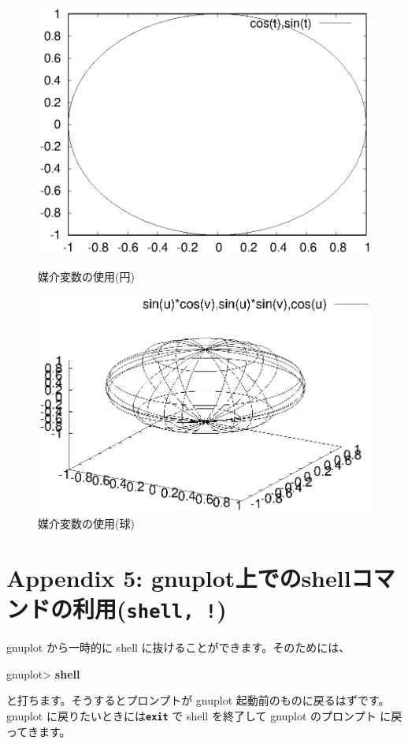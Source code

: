 \documentclass[a4j]{ujarticle} %
\newenvironment{terminal}{%
  \begin{center}
   \begin{minipage}{.8\textwidth}
    \setlength{\FrameSep}{.5\FrameSep}%
    \begin{framed}\ttfamily\small%
     \setlength\baselineskip{.85\baselineskip}%
}{%
    \end{framed}
   \end{minipage}
  \end{center}%
}
\begin{document}
\begin{figure}
 \begin{center}
  \begin{minipage}[hbtp]{0.49\textwidth}
   \includegraphics[width=\hsize]{circle.eps}
   \caption{媒介変数の使用(円)}
   \label{circle}
  \end{minipage}
  \begin{minipage}[hbtp]{0.49\textwidth}
   \includegraphics[width=\hsize]{sphere.eps}
   \caption{媒介変数の使用(球)}
   \label{sphere}
  \end{minipage}
 \end{center}
\end{figure}

\section*{Appendix 5:  gnuplot上でのshellコマンドの利用({\tt\bf shell, !})}
gnuplot から一時的に shell に抜けることができます。そのためには、
\begin{terminal}
 gnuplot> {\bf shell}
\end{terminal}
と打ちます。そうするとプロンプトが gnuplot 起動前のものに戻るはずです。
gnuplot に戻りたいときには{\tt\bf exit} で shell を終了して gnuplot のプロンプト
に戻ってきます。
\end{document}
